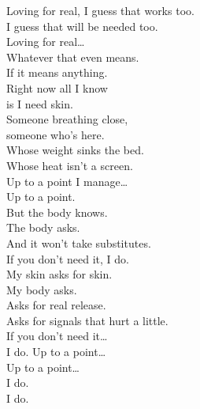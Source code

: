 \begin{lyrics}
Loving for real, I guess that works too.\\
I guess that will be needed too.\\
Loving for real…\\
Whatever that even means.\\
If it means anything.\\
Right now all I know\\
is I need skin.\\
Someone breathing close,\\
someone who’s here.\\
Whose weight sinks the bed.\\
Whose heat isn’t a screen.
\\
Up to a point I manage…\\
Up to a point.\\
But the body knows.\\
The body asks.\\
And it won’t take substitutes.
\\
If you don’t need it, I do.\\
My skin asks for skin.\\
My body asks.\\
Asks for real release.\\
Asks for signals that hurt a little.\\
If you don’t need it…\\
I do.
Up to a point…\\
Up to a point…\\
I do.\\
I do.
\end{lyrics}

